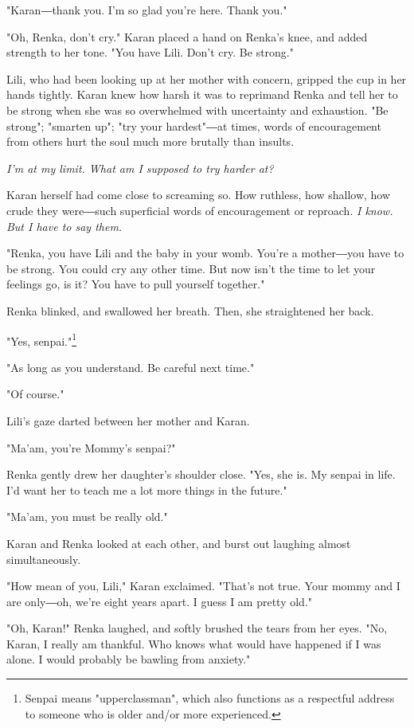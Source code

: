 "Karan―thank you. I'm so glad you're here. Thank you."

"Oh, Renka, don't cry." Karan placed a hand on Renka's knee, and added
strength to her tone. "You have Lili. Don't cry. Be strong."

Lili, who had been looking up at her mother with concern, gripped the
cup in her hands tightly. Karan knew how harsh it was to reprimand Renka
and tell her to be strong when she was so overwhelmed with uncertainty
and exhaustion. "Be strong"; "smarten up"; "try your hardest"―at times,
words of encouragement from others hurt the soul much more brutally than
insults.

\emph{I'm at my limit. What am I supposed to try harder at?}

Karan herself had come close to screaming so. How ruthless, how shallow,
how crude they were―such superficial words of encouragement or reproach.
\emph{I know. But I have to say them.}

"Renka, you have Lili and the baby in your womb. You're a mother―you
have to be strong. You could cry any other time. But now isn't the time
to let your feelings go, is it? You have to pull yourself together."

Renka blinked, and swallowed her breath. Then, she straightened her
back.

"Yes, senpai."\footnote{Senpai means "upperclassman", which also functions as a respectful address to someone who is older and/or more experienced.}

"As long as you understand. Be careful next time."

"Of course."

Lili's gaze darted between her mother and Karan.

"Ma'am, you're Mommy's senpai?"

Renka gently drew her daughter's shoulder close. "Yes, she is. My senpai
in life. I'd want her to teach me a lot more things in the future."

"Ma'am, you must be really old."

Karan and Renka looked at each other, and burst out laughing almost
simultaneously.

"How mean of you, Lili," Karan exclaimed. "That's not true. Your mommy
and I are only―oh, we're eight years apart. I guess I am pretty old."

"Oh, Karan!" Renka laughed, and softly brushed the tears from her eyes.
"No, Karan, I really am thankful. Who knows what would have happened if
I was alone. I would probably be bawling from anxiety."

